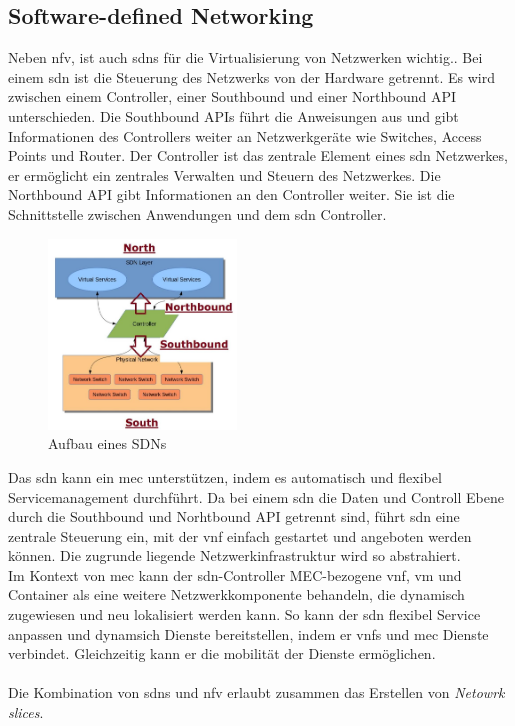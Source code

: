 \documentclass[runningheads]{llncs}
\numberwithin{figure}{section}
\begin{document}
\subsection{Software-defined Networking}
\label{subsec:Software-defined Networking}
Neben \acrshort{nfv}, ist auch \acrlong{sdn}s für die Virtualisierung von Netzwerken wichtig..
Bei einem \acrshort{sdn} ist die Steuerung des Netzwerks von der Hardware getrennt. Es wird zwischen einem Controller, 
einer Southbound und einer Northbound API unterschieden. 
Die Southbound APIs führt die Anweisungen aus und gibt Informationen des Controllers weiter an Netzwerkgeräte wie Switches,
Access Points und Router. Der Controller ist das zentrale Element eines \acrshort{sdn} Netzwerkes, 
er ermöglicht ein zentrales Verwalten und Steuern des 
Netzwerkes. Die Northbound API gibt Informationen an den Controller weiter. Sie ist die Schnittstelle zwischen Anwendungen 
und dem \acrshort{sdn} Controller.\cite{SoftwareDefinedNetworkingSDN}
\begin{figure}
  \includegraphics[width=5cm]{images/SDN-Northbound-and-Southbound-Interfaces-Hong-2014.png}
  \caption{Aufbau eines SDNs}
  \label{fig:sdn}
\end{figure}
Das \acrlong{sdn} kann ein \acrshort{mec} unterstützen, indem es automatisch und flexibel Servicemanagement durchführt.
Da bei einem \acrshort{sdn} die Daten und Controll Ebene durch die Southbound und Norhtbound API getrennt sind, 
führt \acrshort{sdn} eine zentrale Steuerung ein, 
mit der \acrshort{vnf} einfach gestartet und angeboten werden können. 
Die zugrunde liegende Netzwerkinfrastruktur wird so abstrahiert. \\
Im Kontext von \acrshort{mec} kann der \acrshort{sdn}-Controller MEC-bezogene \acrshort{vnf}, 
\acrshort{vm} und Container als eine weitere Netzwerkkomponente behandeln, die dynamisch zugewiesen und neu lokalisiert werden kann.
So kann der \acrshort{sdn} flexibel Service anpassen und dynamsich Dienste bereitstellen, indem er \acrshort{vnf}s und  \acrshort{mec} Dienste verbindet.
Gleichzeitig kann er die mobilität der Dienste ermöglichen.
\\
\\
Die Kombination von \acrshort{sdn}s und \acrshort{nfv} erlaubt zusammen das Erstellen von \textit{Netowrk slices}. 
\end{document}
